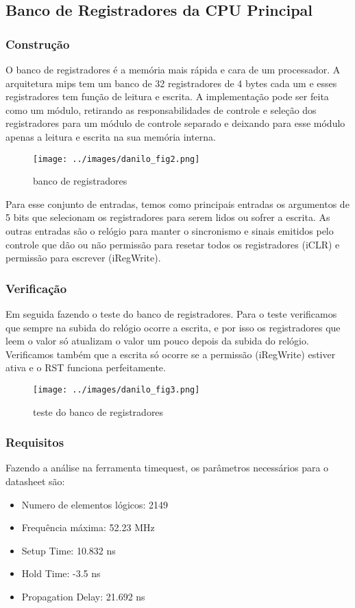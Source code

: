 \subsection{Banco de Registradores da CPU Principal}
	\subsubsection{Construção} 
	O banco de registradores é a memória mais rápida e cara de um processador. A
	arquitetura mips tem um banco de 32 registradores de 4 bytes cada um e esses registradores tem função de leitura e escrita. A implementação pode ser feita como um módulo, retirando as responsabilidades de controle e seleção dos registradores para um módulo de controle separado e deixando para esse módulo apenas a leitura e escrita na sua memória interna.
	
	         \begin{figure}[H]
	                 \centering
	                 \texttt{[image: ../images/danilo\_fig2.png]}
	                \caption{banco de registradores}
	         \end{figure}
	         
	         Para esse conjunto de entradas, temos como principais entradas os argumentos de 5 bits que selecionam os registradores para serem lidos ou sofrer a escrita. As outras entradas são o relógio para manter o sincronismo e sinais emitidos pelo controle que dão ou não permissão para resetar todos os registradores (iCLR) e permissão para escrever (iRegWrite).
	        
\subsubsection{Verificação}
  	 	Em seguida fazendo o teste do banco de registradores. Para o teste verificamos que sempre na subida do relógio ocorre a escrita, e por isso os registradores que leem o valor só atualizam o valor um pouco depois da subida do relógio. Verificamos também que a escrita só ocorre se a permissão (iRegWrite) estiver ativa e o RST funciona perfeitamente.
	         \begin{figure}[H]
	                 \centering
	                 \texttt{[image: ../images/danilo\_fig3.png]}
	                \caption{teste do banco de registradores}
	         \end{figure}
	\subsubsection{Requisitos}
Fazendo a análise na ferramenta timequest, os parâmetros necessários para o datasheet são:
\begin{itemize}
\item Numero de elementos lógicos: 2149
\item Frequência máxima: 52.23 MHz
\item Setup Time: 10.832 ns
\item Hold Time: -3.5 ns
\item Propagation Delay: 21.692 ns
\end{itemize}


